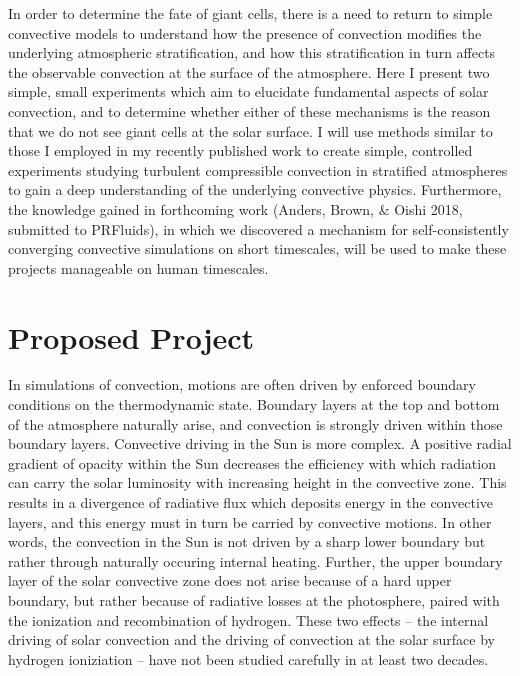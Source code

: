 \documentclass[aasms,12pt]{article}
\begin{document}
In order to determine the fate of giant cells, there is a need to return to simple convective models to
understand how the presence of convection modifies the underlying atmospheric stratification, and how
this stratification in turn affects the observable convection at the surface of the atmosphere.
Here I present two simple, small experiments which aim to elucidate fundamental aspects of solar
convection, and to determine whether either of these mechanisms is the reason that we do not see giant cells
at the solar surface. I will use methods similar to those I employed in my recently published work
\citep{anders&brown2017} to create simple, controlled experiments studying turbulent
compressible convection in stratified atmospheres 
to gain a deep understanding of the underlying convective physics.
Furthermore, the knowledge gained in forthcoming work (Anders, Brown, \& Oishi 2018, submitted to PRFluids),
in which we discovered a mechanism for self-consistently converging convective simulations on short timescales,
will be used to make these projects manageable on human timescales.

\section{Proposed Project}
In simulations of convection, motions are often driven by enforced boundary conditions
on the thermodynamic state.  Boundary layers at the top and bottom of the atmosphere naturally arise,
and convection is strongly driven within those boundary layers.  Convective driving in the Sun is more
complex. A positive radial gradient of opacity within the Sun decreases the efficiency with which
radiation can carry the solar luminosity with increasing height in the convective zone.
This results in a divergence of radiative flux which deposits
energy in the convective layers, and this energy must in turn be carried by convective motions.
In other words, the convection in the Sun is not driven by a sharp lower boundary but rather
through naturally occuring internal heating.
Further, the upper boundary layer of the solar convective zone does not arise because of a hard
upper boundary, but rather because of radiative losses at the photosphere, paired with the ionization and 
recombination of hydrogen. These
two effects -- the internal driving of solar convection and the driving of convection at the solar surface 
by hydrogen ioniziation -- have not been studied carefully in at least two decades.
\end{document}
